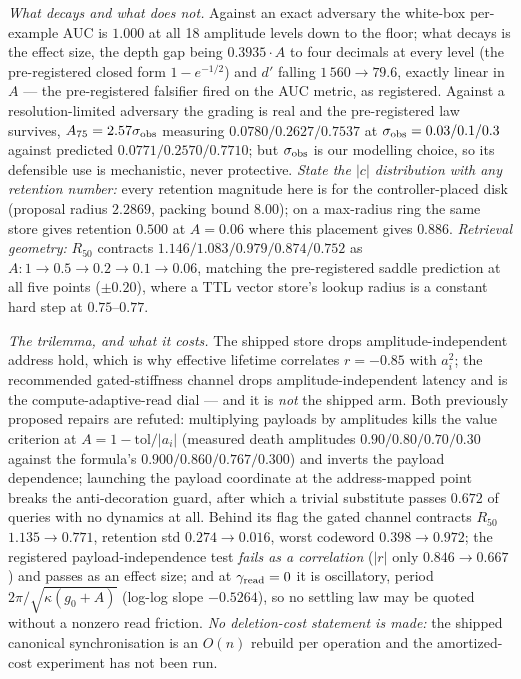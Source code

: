 \documentclass{article}
\begin{document}
\emph{What decays and what does not.} Against an exact adversary the white-box per-example AUC is $1.000$ at all 18 amplitude levels down to the floor; what decays is the effect size, the depth gap being $0.3935\cdot A$ to four decimals at every level (the pre-registered closed form $1-e^{-1/2}$) and $d'$ falling $1\,560\to79.6$, exactly linear in $A$ --- the pre-registered falsifier fired on the AUC metric, as registered. Against a resolution-limited adversary the grading is real and the pre-registered law survives, $A_{75}=2.57\sigma_{\rm obs}$ measuring $0.0780/0.2627/0.7537$ at $\sigma_{\rm obs}=0.03/0.1/0.3$ against predicted $0.0771/0.2570/0.7710$; but $\sigma_{\rm obs}$ is our modelling choice, so its defensible use is mechanistic, never protective. \emph{State the $|c|$ distribution with any retention number:} every retention magnitude here is for the controller-placed disk (proposal radius $2.2869$, packing bound $8.00$); on a max-radius ring the same store gives retention $0.500$ at $A=0.06$ where this placement gives $0.886$. \emph{Retrieval geometry:} $R_{50}$ contracts $1.146/1.083/0.979/0.874/0.752$ as $A:1\to0.5\to0.2\to0.1\to0.06$, matching the pre-registered saddle prediction at all five points ($\pm0.20$), where a TTL vector store's lookup radius is a constant hard step at $0.75$--$0.77$.

\emph{The trilemma, and what it costs.} The shipped store drops amplitude-independent address hold, which is why effective lifetime correlates $r=-0.85$ with $a_i^2$; the recommended gated-stiffness channel drops amplitude-independent latency and is the compute-adaptive-read dial --- and it is \emph{not} the shipped arm. Both previously proposed repairs are refuted: multiplying payloads by amplitudes kills the value criterion at $A=1-\text{tol}/|a_i|$ (measured death amplitudes $0.90/0.80/0.70/0.30$ against the formula's $0.900/0.860/0.767/0.300$) and inverts the payload dependence; launching the payload coordinate at the address-mapped point breaks the anti-decoration guard, after which a trivial substitute passes $0.672$ of queries with no dynamics at all. Behind its flag the gated channel contracts $R_{50}$ $1.135\to0.771$, retention std $0.274\to0.016$, worst codeword $0.398\to0.972$; the registered payload-independence test \emph{fails as a correlation} ($|r|$ only $0.846\to0.667$) and passes as an effect size; and at $\gamma_{\rm read}=0$ it is oscillatory, period $2\pi/\sqrt{\kappa(g_0+A)}$ (log-log slope $-0.5264$), so no settling law may be quoted without a nonzero read friction. \emph{No deletion-cost statement is made:} the shipped canonical synchronisation is an $O(n)$ rebuild per operation and the amortized-cost experiment has not been run.
\end{document}
